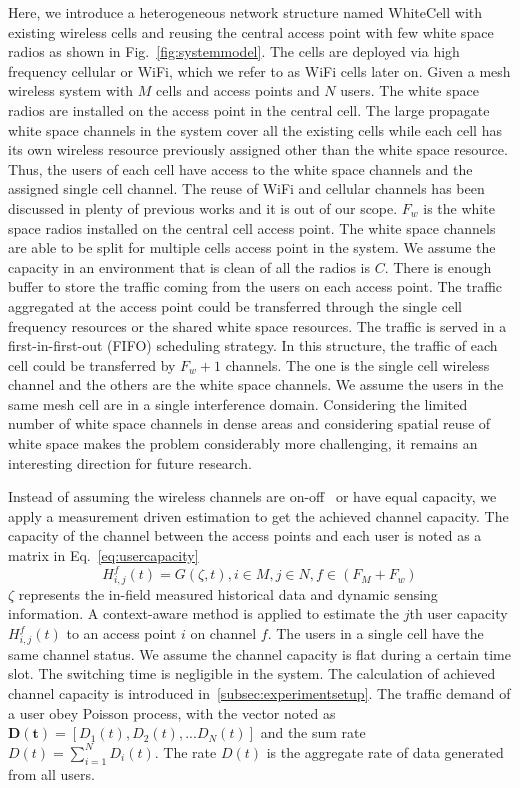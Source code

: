 Here, we introduce a heterogeneous network structure named WhiteCell with existing wireless 
cells and reusing the central access point with few white space radios as shown in 
Fig.~\ref{fig:systemmodel}.
The cells are deployed via high frequency cellular or WiFi, which we refer to as WiFi cells 
later on.
Given a mesh wireless system with $M$ cells and access points and $N$ users.
The white space radios are installed on the access point in the central cell.
The large propagate white space channels in the system cover all the existing cells while 
each cell has its own wireless resource previously assigned other than the white space resource.
Thus, the users of each cell have access to the white space channels and the assigned single cell  
channel. 
The reuse of WiFi and cellular channels has been discussed in plenty of previous works and it is 
out of our scope.
$F_w$ is the white space radios installed on the central cell access point.
The white space channels are able to be split for multiple cells access point in the system.
We assume the capacity in an environment that is clean of all the radios is $C$. 
There is enough buffer to store the traffic coming from the users on each access point.
The traffic aggregated at the access point could be transferred through the single cell 
frequency resources or the shared white space resources.
The traffic is served in a first-in-first-out (FIFO) scheduling strategy.
In this structure, the traffic of each cell could be transferred by $F_w+1$ channels.
The one is the single cell wireless channel and the others are the white space channels.
We assume the users in the same mesh cell are in a single interference domain. 
Considering the limited number of white space channels in dense areas and considering spatial reuse 
of white space makes the problem considerably more challenging, it remains an interesting 
direction for future research. 

Instead of assuming the wireless channels are on-off~\cite{bodas2012low} or have equal capacity, 
we apply a measurement driven estimation to get the achieved channel capacity. The capacity of the 
channel between the access points and each user is noted as a matrix in Eq.~\ref{eq:usercapacity}
\begin{equation}
\label{eq:usercapacity}
H_{i,j}^f(t)= G(\zeta,t),i \in M, j\in N, f \in (F_M+F_w) 
\end{equation} 
$\zeta$ represents the in-field measured historical data and dynamic sensing information.
A context-aware method is applied to estimate the $j$th user capacity $H_{i,j}^f(t)$ to an access point 
$i$ on channel $f$. The users in a single cell have the same channel status. We assume the channel 
capacity is flat during a certain time slot. The switching time is negligible in the system.
The calculation of achieved channel capacity is introduced in~\ref{subsec:experimentsetup}. 
The traffic demand of a user obey Poisson process, with the vector noted as 
$\bm{D(t)} = [D_1(t),D_2(t),...D_N(t)]$ and the sum rate $D(t) = \sum\limits_{i=1}^N D_i(t)$. 
The rate $D(t)$ is the aggregate rate of data generated from all users. 

